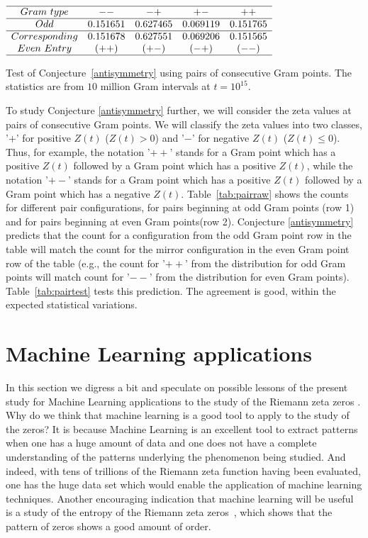 \documentclass[twoside]{article}
\theoremstyle{definition}
\begin{document}
{\begin{table}
\centering \(\begin{array}{ccccc}
\hline
 Gram~type&   --   & -+   & +-   & ++  \\
\hline
Odd & 0.151651&0.627465&0.069119&0.151765\\
\hline
Corresponding& 0.151678 & 0.627551 & 0.069206& 0.151565\\ 
Even~Entry     & (++)     & (+-)   & (-+)  & (--) \\
\hline
\end{array}\)
\caption{Test of Conjecture~\ref{antisymmetry} using pairs of consecutive Gram points.  The statistics are from $10$ million Gram intervals at $t=10^{15}$.} \label{tab:pairtest}
\end{table}
To study Conjecture \ref{antisymmetry} further, we will consider the zeta values at pairs of consecutive Gram points. We will classify the zeta values into two classes, '$+$' for positive $Z(t)$  ($Z(t) > 0$) and '$-$' for negative $Z(t)$ ($Z(t) \leqslant  0$). Thus, for example, the notation '$++$' stands for a Gram point which has a positive $Z(t)$ followed by a Gram point which has a positive $Z(t)$, while the notation '$+-$' stands for a Gram point which has a positive $Z(t)$ followed by a Gram point which has a negative $Z(t)$. Table~\ref{tab:pairraw} shows the counts for different pair configurations, for pairs beginning at odd Gram points (row 1) and for pairs beginning at even Gram points(row 2). Conjecture \ref{antisymmetry} predicts that the count for a configuration from the odd Gram point row in the table  will match the count for the mirror configuration in the even Gram point row of the table (e.g., the count for '$++$' from the distribution for odd Gram points will match count for '$--$' from the distribution for even Gram points). Table~\ref{tab:pairtest} tests this prediction. The agreement is good, within the expected statistical variations. 

\section{\label{machineLearning}Machine Learning applications}
In this section we digress a bit and speculate on possible lessons of the present study for Machine Learning applications to the study of the Riemann zeta zeros \cite{osneural,osentropy}.
Why do we think that machine learning is a good tool to apply to the study of the zeros? It is because Machine Learning is an excellent tool to extract patterns when one has a huge amount of data and one does not have a complete understanding of the patterns underlying the phenomenon being studied. And indeed, with tens of trillions of the Riemann zeta function having been evaluated, one has the huge data set which would enable the application of machine learning techniques. Another encouraging indication that machine learning will be useful is a study of the entropy of the Riemann zeta zeros~\cite{osentropy}, which shows that the pattern of zeros shows a good amount of order.

}
\end{document}
